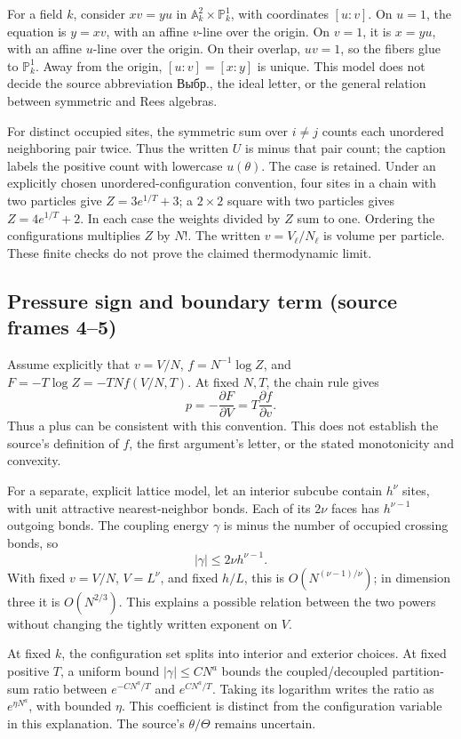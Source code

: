 \documentclass[11pt]{article}
\begin{document}
For a field \(k\), consider \(xv=yu\) in \(\mathbb A^2_k\times\mathbb P^1_k\), with coordinates \([u:v]\). On \(u=1\), the equation is \(y=xv\), with an affine \(v\)-line over the origin. On \(v=1\), it is \(x=yu\), with an affine \(u\)-line over the origin. On their overlap, \(uv=1\), so the fibers glue to \(\mathbb P^1_k\). Away from the origin, \([u:v]=[x:y]\) is unique. This model does not decide the source abbreviation Выбр., the ideal letter, or the general relation between symmetric and Rees algebras.

For distinct occupied sites, the symmetric sum over \(i\ne j\) counts each unordered neighboring pair twice. Thus the written \(U\) is minus that pair count; the caption labels the positive count with lowercase \(u(\theta)\). The case is retained. Under an explicitly chosen unordered-configuration convention, four sites in a chain with two particles give \(Z=3e^{1/T}+3\); a \(2\times2\) square with two particles gives \(Z=4e^{1/T}+2\). In each case the weights divided by \(Z\) sum to one. Ordering the configurations multiplies \(Z\) by \(N!\). The written \(v=V_\ell/N_\ell\) is volume per particle. These finite checks do not prove the claimed thermodynamic limit.

\subsection*{Pressure sign and boundary term (source frames 4–5)}
Assume explicitly that \(v=V/N\), \(f=N^{-1}\log Z\), and \(F=-T\log Z=-TNf(V/N,T)\). At fixed \(N,T\), the chain rule gives
\[p=-\frac{\partial F}{\partial V}=T\frac{\partial f}{\partial v}.\]
Thus a plus can be consistent with this convention. This does not establish the source's definition of \(f\), the first argument's letter, or the stated monotonicity and convexity.

For a separate, explicit lattice model, let an interior subcube contain \(h^\nu\) sites, with unit attractive nearest-neighbor bonds. Each of its \(2\nu\) faces has \(h^{\nu-1}\) outgoing bonds. The coupling energy \(\gamma\) is minus the number of occupied crossing bonds, so
\[|\gamma|\le 2\nu h^{\nu-1}.\]
With fixed \(v=V/N\), \(V=L^\nu\), and fixed \(h/L\), this is \(O(N^{(\nu-1)/\nu})\); in dimension three it is \(O(N^{2/3})\). This explains a possible relation between the two powers without changing the tightly written exponent on \(V\).

At fixed \(k\), the configuration set splits into interior and exterior choices. At fixed positive \(T\), a uniform bound \(|\gamma|\le CN^a\) bounds the coupled/decoupled partition-sum ratio between \(e^{-CN^a/T}\) and \(e^{CN^a/T}\). Taking its logarithm writes the ratio as \(e^{\eta N^a}\), with bounded \(\eta\). This coefficient is distinct from the configuration variable in this explanation. The source's \(\theta/\Theta\) remains uncertain.
\end{document}
